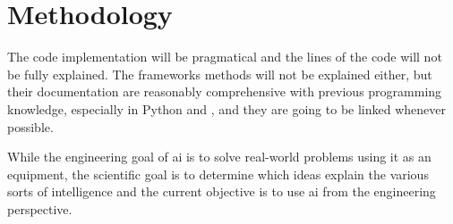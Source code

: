 \chapter{Methodology}\label{sec:methodology}

The code implementation will be pragmatical and the lines of the code will not be fully explained. The frameworks methods will not be explained either, but their documentation are reasonably comprehensive with previous programming knowledge, especially in Python and \matlab, and they are going to be linked whenever possible.

While the engineering goal of \gls*{ai} is to solve real-world problems using it as an equipment, the scientific goal is to determine which ideas explain the various sorts of intelligence \cite{winston1992} and the current objective is to use \gls*{ai} from the engineering perspective.


